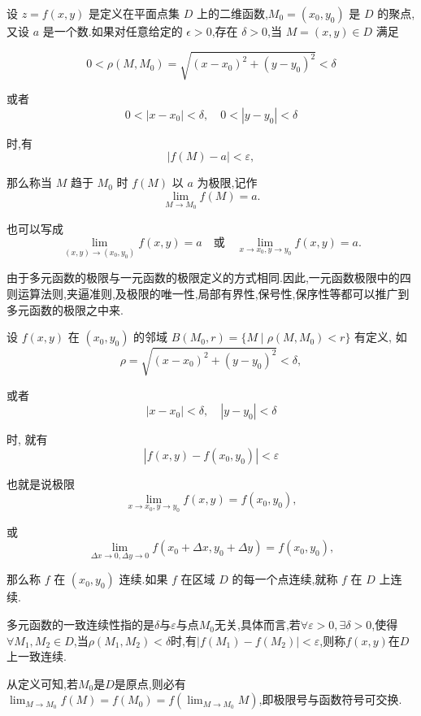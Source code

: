 \begin{definition}
    设 \( z = f(x, y) \) 是定义在平面点集 \( D \) 上的二维函数,\( M_0 = (x_0, y_0) \) 是 \( D \) 的聚点,又设 \( a \) 是一个数.如果对任意给定的 \( \epsilon > 0 \),存在 \( \delta > 0 \),当 \( M = (x, y) \in D \) 满足

$$
0 < \rho(M, M_0) = \sqrt{(x - x_0)^2 + (y - y_0)^2} < \delta
$$

或者
$$
0 < |x - x_0| < \delta, \quad 0 < |y - y_0| < \delta
$$

时,有
$$
|f(M) - a| < \varepsilon,
$$

那么称当 \( M \) 趋于 \( M_0 \) 时 \( f(M) \) 以 \( a \) 为极限,记作
$$
\lim_{M \to M_0} f(M) = a.
$$

也可以写成
$$
\lim_{(x, y) \to (x_0, y_0)} f(x, y) = a \quad \text{或} \quad \lim_{x \to x_0 , y \to y_0} f(x, y) = a.
$$
\end{definition}

由于多元函数的极限与一元函数的极限定义的方式相同.因此,一元函数极限中的四则运算法则,夹逼准则,及极限的唯一性,局部有界性,保号性,保序性等都可以推广到多元函数的极限之中来.

\begin{definition}
    设 \( f(x, y) \) 在 \( (x_0, y_0) \) 的邻域 \( B(M_0, r) = \{ M \mid \rho(M, M_0) < r \} \) 有定义, 如
$$
\rho = \sqrt{(x - x_0)^2 + (y - y_0)^2} < \delta,
$$

或者
$$
|x - x_0| < \delta, \quad |y - y_0| < \delta
$$

时, 就有
$$
|f(x, y) - f(x_0, y_0)| < \varepsilon
$$

也就是说极限
$$
\lim_{x \to x_0, y \to y_0} f(x, y) = f(x_0, y_0),
$$

或
$$
\lim_{\Delta x \to 0, \Delta y \to 0} f(x_0 + \Delta x, y_0 + \Delta y) = f(x_0, y_0),
$$

那么称 \( f \) 在 \( (x_0, y_0) \) 连续.如果 \( f \) 在区域 \( D \) 的每一个点连续,就称 \( f \) 在 \( D \) 上连续.
\end{definition}

\begin{remark}
    多元函数的一致连续性指的是$\delta$与$\varepsilon$与点$M_0$无关,具体而言,若$\forall \varepsilon > 0, \exists \delta > 0$,使得$\forall M_1,M_2 \in D$,当$\rho(M_1,M_2) < \delta$时,有$|f(M_1)-f(M_2)| < \varepsilon$,则称$f(x,y)$在$D$上一致连续.
\end{remark}

从定义可知,若$M_0$是$D$是原点,则必有$\lim_{M \to M_0} f(M) = f(M_0) = f(\lim_{M \to M_0} M)$,即极限号与函数符号可交换.

